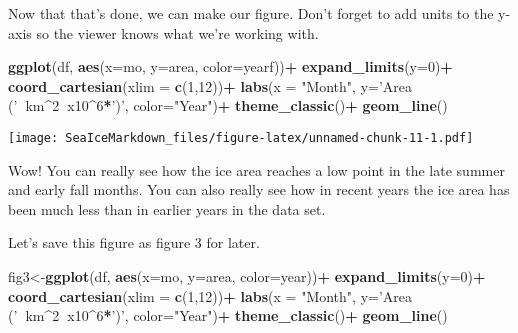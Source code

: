 \documentclass[]{article}
\newenvironment{Shaded}{\begin{snugshade}}{\end{snugshade}}
\newcommand{\KeywordTok}[1]{\textcolor[rgb]{0.13,0.29,0.53}{\textbf{#1}}}
\newcommand{\DataTypeTok}[1]{\textcolor[rgb]{0.13,0.29,0.53}{#1}}
\newcommand{\DecValTok}[1]{\textcolor[rgb]{0.00,0.00,0.81}{#1}}
\newcommand{\StringTok}[1]{\textcolor[rgb]{0.31,0.60,0.02}{#1}}
\newcommand{\OperatorTok}[1]{\textcolor[rgb]{0.81,0.36,0.00}{\textbf{#1}}}
\newcommand{\NormalTok}[1]{#1}
\begin{document}
Now that that's done, we can make our figure. Don't forget to add units
to the y-axis so the viewer knows what we're working with.

\begin{Shaded}
\begin{Highlighting}[]
\KeywordTok{ggplot}\NormalTok{(df, }\KeywordTok{aes}\NormalTok{(}\DataTypeTok{x=}\NormalTok{mo, }\DataTypeTok{y=}\NormalTok{area, }\DataTypeTok{color=}\NormalTok{yearf))}\OperatorTok{+}
\StringTok{  }\KeywordTok{expand_limits}\NormalTok{(}\DataTypeTok{y=}\DecValTok{0}\NormalTok{)}\OperatorTok{+}
\StringTok{  }\KeywordTok{coord_cartesian}\NormalTok{(}\DataTypeTok{xlim =} \KeywordTok{c}\NormalTok{(}\DecValTok{1}\NormalTok{,}\DecValTok{12}\NormalTok{))}\OperatorTok{+}
\StringTok{  }\KeywordTok{labs}\NormalTok{(}\DataTypeTok{x =} \StringTok{"Month"}\NormalTok{, }\DataTypeTok{y=}\StringTok{'Area ('}\OperatorTok{~}\NormalTok{km}\OperatorTok{^}\DecValTok{2}\OperatorTok{~}\NormalTok{x10}\OperatorTok{^}\DecValTok{6}\OperatorTok{*}\StringTok{')'}\NormalTok{, }\DataTypeTok{color=}\StringTok{"Year"}\NormalTok{)}\OperatorTok{+}
\StringTok{  }\KeywordTok{theme_classic}\NormalTok{()}\OperatorTok{+}
\StringTok{  }\KeywordTok{geom_line}\NormalTok{()}
\end{Highlighting}
\end{Shaded}

\texttt{[image: SeaIceMarkdown\_files/figure-latex/unnamed-chunk-11-1.pdf]}

Wow! You can really see how the ice area reaches a low point in the late
summer and early fall months. You can also really see how in recent
years the ice area has been much less than in earlier years in the data
set.

Let's save this figure as figure 3 for later.

\begin{Shaded}
\begin{Highlighting}[]
\NormalTok{fig3<-}\KeywordTok{ggplot}\NormalTok{(df, }\KeywordTok{aes}\NormalTok{(}\DataTypeTok{x=}\NormalTok{mo, }\DataTypeTok{y=}\NormalTok{area, }\DataTypeTok{color=}\NormalTok{year))}\OperatorTok{+}
\StringTok{  }\KeywordTok{expand_limits}\NormalTok{(}\DataTypeTok{y=}\DecValTok{0}\NormalTok{)}\OperatorTok{+}
\StringTok{  }\KeywordTok{coord_cartesian}\NormalTok{(}\DataTypeTok{xlim =} \KeywordTok{c}\NormalTok{(}\DecValTok{1}\NormalTok{,}\DecValTok{12}\NormalTok{))}\OperatorTok{+}
\StringTok{  }\KeywordTok{labs}\NormalTok{(}\DataTypeTok{x =} \StringTok{"Month"}\NormalTok{, }\DataTypeTok{y=}\StringTok{'Area ('}\OperatorTok{~}\NormalTok{km}\OperatorTok{^}\DecValTok{2}\OperatorTok{~}\NormalTok{x10}\OperatorTok{^}\DecValTok{6}\OperatorTok{*}\StringTok{')'}\NormalTok{, }\DataTypeTok{color=}\StringTok{"Year"}\NormalTok{)}\OperatorTok{+}
\StringTok{  }\KeywordTok{theme_classic}\NormalTok{()}\OperatorTok{+}
\StringTok{  }\KeywordTok{geom_line}\NormalTok{()}
\end{Highlighting}
\end{Shaded}
\end{document}
